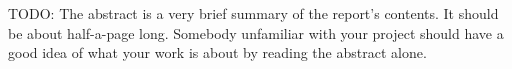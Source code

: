 TODO: The abstract is a very brief summary of the report's contents. It should be about half-a-page long. Somebody unfamiliar with your project should have a good idea of what your work is about by reading the abstract alone.